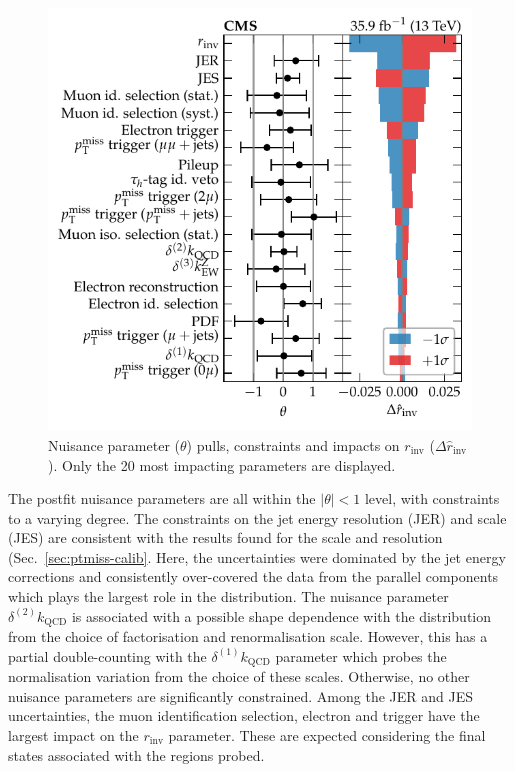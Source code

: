 \begin{figure}
    \centering
    \includegraphics{chapters/043_results/images/finalfit-impacts.pdf}
    \caption[Nuisance parameters after a fit to the data between the signal and control regions.]{
        Nuisance parameter ($\theta$) pulls, constraints and impacts on $r_{\mathrm{inv}}$ ($\Delta \hat{r}_{\mathrm{inv}}$). Only the 20 most impacting parameters are displayed.
    }
    \label{fig:finalfit-impacts}
\end{figure}
%
The postfit nuisance parameters are all within the $|\theta|<1$ level, with constraints to a varying degree. The constraints on the jet energy resolution (JER) and scale (JES) are consistent with the results found for the \ptmiss scale and resolution (Sec.~\ref{sec:ptmiss-calib}. Here, the uncertainties were dominated by the jet energy corrections and consistently over-covered the data from the parallel components which plays the largest role in the \recoil distribution. The nuisance parameter $\delta^{(2)}k_{\mathrm{QCD}}$ is associated with a possible shape dependence with the \recoil distribution from the choice of factorisation and renormalisation scale. However, this has a partial double-counting with the $\delta^{(1)}k_{\mathrm{QCD}}$ parameter which probes the normalisation variation from the choice of these scales.  Otherwise, no other nuisance parameters are significantly constrained. Among the JER and JES uncertainties, the muon identification selection, electron and \ptmiss trigger have the largest impact on the $r_{\mathrm{inv}}$ parameter.  These are expected considering the final states associated with the regions probed.

